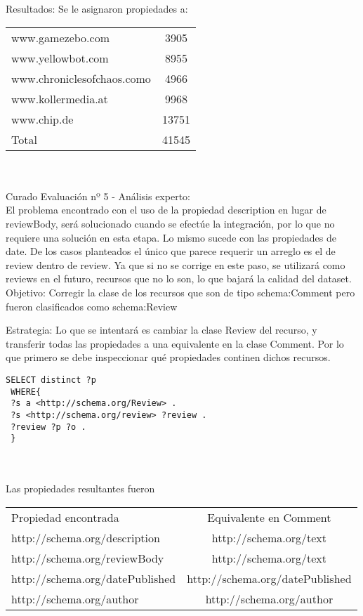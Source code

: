 Resultados:
Se le asignaron propiedades a:
\begin{tabular}{| l | c |}
 www.gamezebo.com & 3905\\
 www.yellowbot.com & 8955\\
 www.chroniclesofchaos.como & 4966\\
 www.kollermedia.at & 9968\\
 www.chip.de & 13751\\
 Total & 41545
\end{tabular}\\
\\
Curado Evaluación nº 5 - Análisis experto:
\\
El problema encontrado con el uso de la propiedad description en lugar de reviewBody, será solucionado cuando se efectúe la integración, 
por lo que no requiere una solución en esta etapa. Lo mismo sucede con las propiedades de date.
De los casos planteados el único que parece requerir un arreglo es el de review dentro de review. Ya que si no se corrige en este paso, 
se utilizará como reviews en el futuro, recursos que no lo son, lo que bajará la calidad del dataset.
\\
Objetivo:
Corregir la clase de los recursos que son de tipo schema:Comment pero fueron clasificados como schema:Review

Estrategia: 
Lo que se intentará es cambiar la clase Review del recurso, y transferir todas las propiedades a una equivalente en la clase Comment.
Por lo que primero se debe inspeccionar qué propiedades continen dichos recursos.

\begin{lstlisting}[frame=single]
 SELECT distinct ?p
 WHERE{
 ?s a <http://schema.org/Review> .
 ?s <http://schema.org/review> ?review .
 ?review ?p ?o .
 }
\end{lstlisting}\\
\\
Las propiedades resultantes fueron
\begin{tabular}{| l | c |}
Propiedad encontrada & Equivalente en Comment\\
http://schema.org/description & http://schema.org/text \\
http://schema.org/reviewBody & http://schema.org/text \\
http://schema.org/datePublished & http://schema.org/datePublished \\
http://schema.org/author & http://schema.org/author
\end{tabular}

